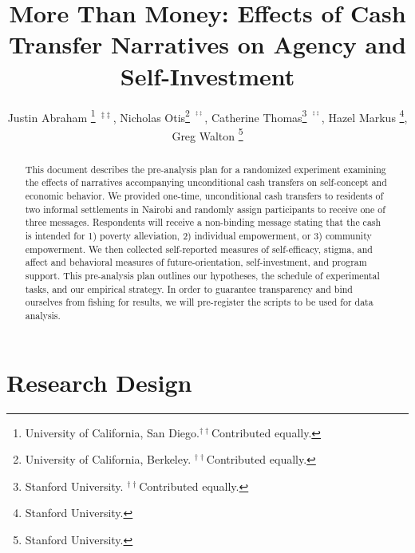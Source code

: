 \documentclass[11pt, a4paper]{article}\usepackage[]{graphicx}\usepackage[]{color}
\begin{document}

\title{More Than Money: Effects of Cash Transfer Narratives on Agency and Self-Investment}
\begin{onehalfspace}

\author{
  Justin Abraham \thanks{University of California, San Diego.$^{\dagger\dagger}$Contributed
equally.}~$^{\ddagger\ddagger}$,
  Nicholas Otis\thanks{University of California, Berkeley. $^{\dagger\dagger}$Contributed
equally.}~$^{^{\ddagger\ddagger}}$,
  Catherine Thomas\thanks{Stanford University. $^{\dagger\dagger}$Contributed equally.}~$^{^{\ddagger\ddagger}}$,
  Hazel Markus \thanks{Stanford University.},
  Greg Walton \thanks{Stanford University.}
        }

\end{onehalfspace}

\maketitle

\begin{abstract}

    This document describes the pre-analysis plan for a randomized experiment examining the effects of narratives accompanying unconditional cash transfers on self-concept and economic behavior. We provided one-time, unconditional cash transfers to residents of two informal settlements in Nairobi and randomly assign participants to receive one of three messages. Respondents will receive a non-binding message stating that the cash is intended for 1) poverty alleviation, 2) individual empowerment, or 3) community empowerment. We then collected self-reported measures of self-efficacy, stigma, and affect and behavioral measures of future-orientation, self-investment, and program support. This pre-analysis plan outlines our hypotheses, the schedule of experimental tasks, and our empirical strategy. In order to guarantee transparency and bind ourselves from fishing for results, we will pre-register the scripts to be used for data analysis.

\end{abstract}

\newpage

\tableofcontents

\newpage

\section{Research Design}
\end{document}
